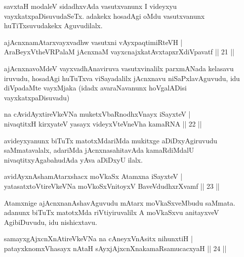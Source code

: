 \begin{artha}
savxtaH modaleV sidadhxvAda vasutxvanunx I videyxyu vayxkatxpaDisuvudaSeTx. adakekx hosadAgi oMdu vasutxvanunx huTiTxsuvudakekx Aguvudilalx.
\end{artha}

\begin{shl}
ajAcnxnamAtarxvayxvadhw vasutxni vAyxpaqtimiRteVH |\\
AraBeyxV\s theVR\s PalaM jAcnxnaM vayxcnajxkatAvxtapxrXdiVpavatf \hfill || 21 ||
\end{shl}

\begin{artha}
ajAcnxnavoMdeV vayxvadhAnaviruva vasutxvinalilx parxmANada kelasavu iruvudu, hosadAgi huTuTxva viSayadalilx jAcnxnavu niSaPxlavAguvudu, idu diVpadaMte vayxMjaka (idadx avaraNavanunx hoVgalADisi vayxkatxpaDisuvadu)
\end{artha}


\begin{shl}
na cAvidAyxtireVkeVNa muketxVbaRnodhxV\s nayx iSayxteV |\\
nivaqtitxH kirxyateV yasayx videyxVteVneVha kamaRNA \hfill || 22 ||
\end{shl}

\begin{artha}
avideyxyanunx biTuTx matotxMdariMda mukitxge aDiDxyAgiruvudu saMmatavalalx, adariMda jAcnxnasahitavAda kamaRdiMdalU nivaqtitxyAgabahudAda yAva aDiDxyU ilalx.
\end{artha}

\begin{shl}
avidAyxnAshamAtarxshacx moVkaSx Atamxna iSayxteV |\\
yatasatxtoV\s tireVkeVNa moVkoSxV\s nitoyxV BaveVdudhxrXvamf \hfill || 23 ||
\end{shl}

\begin{artha}
Atamxnige ajAcnxnanAshavAguvudu mAtarx moVkaSxveMbudu saMmata. adanunx biTuTx matotxMda riVtiyiruvalilx A moVkaSxvu anitayxveV AgibiDuvudu, idu nishicxtavu.
\end{artha}

\begin{shl}
samayxgAjxcnXnAtireVkeVNa na cAneyxVnAsitx nihunxtiH |\\
patayxknomxVhasayx nAtaH sAyxjAjxcnXnakamaRsamucacxyaH \hfill || 24 ||
\end{shl}

